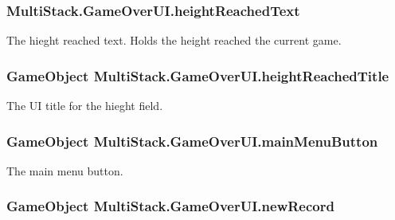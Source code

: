\subsubsection[{height\+Reached\+Text}]{ Multi\+Stack.\+Game\+Over\+U\+I.\+height\+Reached\+Text}\label{class_multi_stack_1_1_game_over_u_i_a13eaa345c99a247a23a78f57dc570153}


The hieght reached text. Holds the height reached the current game. 

\hypertarget{class_multi_stack_1_1_game_over_u_i_a1d0719d80ce2ba07002511401b65d77c}{}
\subsubsection[{height\+Reached\+Title}]{\setlength{\rightskip}{0pt plus 5cm}Game\+Object Multi\+Stack.\+Game\+Over\+U\+I.\+height\+Reached\+Title}\label{class_multi_stack_1_1_game_over_u_i_a1d0719d80ce2ba07002511401b65d77c}


The U\+I title for the hieght field. 

\hypertarget{class_multi_stack_1_1_game_over_u_i_a4e55a5b8332763f189d1c38877928f5a}{}
\subsubsection[{main\+Menu\+Button}]{\setlength{\rightskip}{0pt plus 5cm}Game\+Object Multi\+Stack.\+Game\+Over\+U\+I.\+main\+Menu\+Button}\label{class_multi_stack_1_1_game_over_u_i_a4e55a5b8332763f189d1c38877928f5a}


The main menu button. 

\hypertarget{class_multi_stack_1_1_game_over_u_i_ae3084bf607085cbb2cc4d8c4e7897c4b}{}
\subsubsection[{new\+Record}]{\setlength{\rightskip}{0pt plus 5cm}Game\+Object Multi\+Stack.\+Game\+Over\+U\+I.\+new\+Record}\label{class_multi_stack_1_1_game_over_u_i_ae3084bf607085cbb2cc4d8c4e7897c4b}



